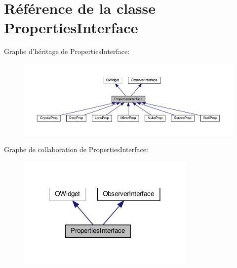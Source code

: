 \hypertarget{classPropertiesInterface}{\section{Référence de la classe Properties\+Interface}
\label{classPropertiesInterface}
}


Graphe d'héritage de Properties\+Interface\+:\nopagebreak
\begin{figure}[H]
\begin{center}
\leavevmode
\includegraphics[width=350pt]{d5/d18/classPropertiesInterface__inherit__graph}
\end{center}
\end{figure}


Graphe de collaboration de Properties\+Interface\+:\nopagebreak
\begin{figure}[H]
\begin{center}
\leavevmode
\includegraphics[width=247pt]{da/d04/classPropertiesInterface__coll__graph}
\end{center}
\end{figure}
